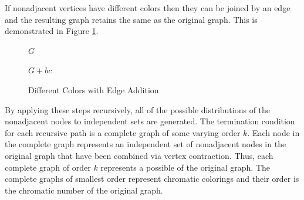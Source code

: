 If nonadjacent vertices have different colors then they can be joined by an edge and the resulting graph retains
the same  as the original graph.  This is demonstrated in Figure \ref{fig:zeadd}.

\begin{figure}[h]
  \label{fig:zeadd}
  \begin{center}
    \begin{minipage}{2in}
      \begin{center}

        \bigskip

        \(G\)
      \end{center}
    \end{minipage}
    \begin{minipage}{2in}
      \begin{center}

        \bigskip

        \(G+bc\)
      \end{center}
    \end{minipage}
  \end{center}
  \caption{Different Colors with Edge Addition}
\end{figure}

By applying these steps recursively, all of the possible distributions of the nonadjacent nodes to independent sets
are generated.  The termination condition for each recursive path is a complete graph of some varying order \(k\).
Each node in the complete graph represents an independent set of nonadjacent nodes in the original graph that have
been combined via vertex contraction.  Thus, each complete graph of order \(k\) represents a possible 
of the original graph.  The complete graphs of smallest order represent chromatic colorings and their order is the
chromatic number of the original graph.

